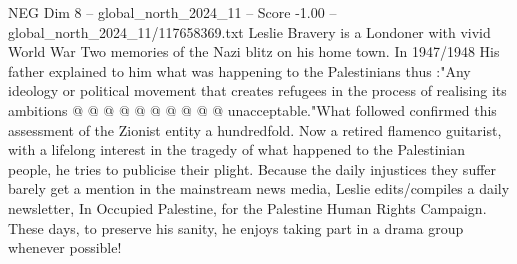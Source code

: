 \begin{textsample}{NEG Dim 8 – global\_north\_2024\_11 – Score -1.00 – global\_north\_2024\_11/117658369.txt}
Leslie Bravery is a Londoner with vivid World War Two memories of the Nazi blitz on his home town.
In 1947/1948 His father explained to him what was happening to the Palestinians thus :"Any ideology or political movement that creates refugees in the process of realising its ambitions @ @ @ @ @ @ @ @ @ @ unacceptable."What followed confirmed this assessment of the Zionist entity a hundredfold.
Now a retired flamenco guitarist, with a lifelong interest in the tragedy of what happened to the Palestinian people, he tries to publicise their plight.
Because the daily injustices they suffer barely get a mention in the mainstream news media, Leslie edits/compiles a daily newsletter, In Occupied Palestine, for the Palestine Human Rights Campaign.
These days, to preserve his sanity, he enjoys taking part in a drama group whenever possible!

\end{textsample}
